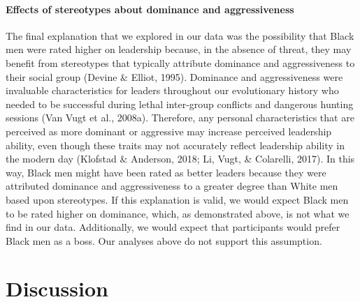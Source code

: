 \documentclass[
  english,
  man]{apa6}
\let\oldparagraph\paragraph
\renewcommand{\paragraph}[1]{\oldparagraph{#1}\mbox{}}
\begin{document}
\hypertarget{effects-of-stereotypes-about-dominance-and-aggressiveness}{%
\paragraph{Effects of stereotypes about dominance and aggressiveness}\label{effects-of-stereotypes-about-dominance-and-aggressiveness}}

The final explanation that we explored in our data was the possibility that Black men were rated higher on leadership because, in the absence of threat, they may benefit from stereotypes that typically attribute dominance and aggressiveness to their social group (Devine \& Elliot, 1995). Dominance and aggressiveness were invaluable characteristics for leaders throughout our evolutionary history who needed to be successful during lethal inter-group conflicts and dangerous hunting sessions (Van Vugt et al., 2008a). Therefore, any personal characteristics that are perceived as more dominant or aggressive may increase perceived leadership ability, even though these traits may not accurately reflect leadership ability in the modern day (Klofstad \& Anderson, 2018; Li, Vugt, \& Colarelli, 2017). In this way, Black men might have been rated as better leaders because they were attributed dominance and aggressiveness to a greater degree than White men based upon stereotypes. If this explanation is valid, we would expect Black men to be rated higher on dominance, which, as demonstrated above, is not what we find in our data. Additionally, we would expect that participants would prefer Black men as a boss. Our analyses above do not support this assumption.

\hypertarget{discussion}{%
\section{Discussion}\label{discussion}}
\end{document}
